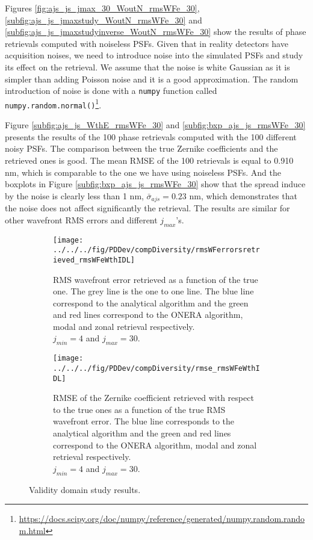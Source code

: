 Figures \ref{fig:ajs_js_jmax_30_WoutN_rmsWFe_30}, \ref{subfig:ajs_js_jmaxstudy_WoutN_rmsWFe_30} and \ref{subfig:ajs_js_jmaxstudyinverse_WoutN_rmsWFe_30} show the results of phase retrievals computed with noiseless PSFs. Given that in reality detectors have acquisition noises, we need to introduce noise into the simulated PSFs and study its effect on the retrieval. We assume that the noise is white Gaussian as it is simpler than adding Poisson noise and it is a good approximation. The random introduction of noise is done with a \verb!numpy! function called \verb!numpy.random.normal()!\footnote{\url{https://docs.scipy.org/doc/numpy/reference/generated/numpy.random.random.html}}.

Figure \ref{subfig:ajs_js_WthE_rmsWFe_30} and \ref{subfig:bxp_ajs_js_rmsWFe_30} presents the results of the 100 phase retrievals computed with the 100 different noisy PSFs. The comparison between the true Zernike coefficients and the retrieved ones is good. The mean RMSE of the 100 retrievals is equal to 0.910 nm, which is comparable to the one we have using noiseless PSFs. And the boxplots in Figure \ref{subfig:bxp_ajs_js_rmsWFe_30} show that the spread induce by the noise is clearly less than 1 nm, $\bar{\sigma}_{ajs} = 0.23$ nm, which demonstrates that the noise does not affect significantly the retrieval. The results are similar for other wavefront RMS errors and different $j_{max}$'s.

\begin{figure}
\centering
    \begin{subfigure}{0.45\textwidth}
        \texttt{[image: ../../../fig/PDDev/compDiversity/rmsWFerrorsretrieved\_rmsWFeWthIDL]}
        \caption{RMS wavefront error retrieved as a function of the true one. The grey line is the one to one line. The blue line correspond to the analytical algorithm and the green and red lines correspond to the ONERA algorithm, modal and zonal retrieval respectively. \\ $j_{min}=4$ and $j_{max}=30$.}
        \label{subfig:rmsWFerrorsretrieved_rmsWFeWthIDL}
    \end{subfigure}
    \quad
    \begin{subfigure}{0.45\textwidth}
        \texttt{[image: ../../../fig/PDDev/compDiversity/rmse\_rmsWFeWthIDL]}
        \caption{RMSE of the Zernike coefficient retrieved with respect to the true ones as a function of the true RMS wavefront error. The blue line corresponds to the analytical algorithm and the green and red lines correspond to the ONERA algorithm, modal and zonal retrieval respectively. \\ $j_{min}=4$ and $j_{max}=30$.}
        \label{subfig:rmse_rmsWFeWthIDL}
    \end{subfigure}
    \decoRule
    \caption{Validity domain study results.}
\end{figure}


